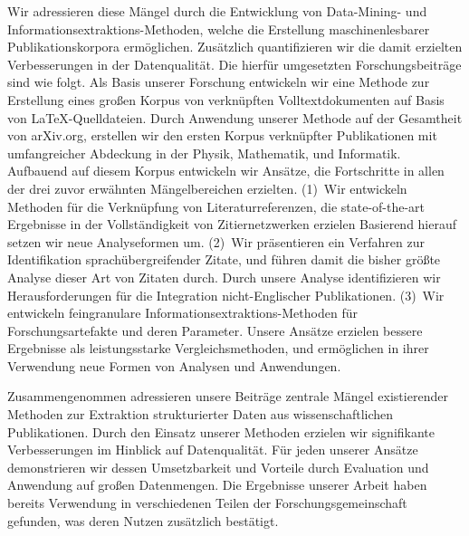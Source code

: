 Wir adressieren diese Mängel durch die Entwicklung von Data-Mining- und In\-for\-ma\-tions\-ex\-trak\-tions-Methoden, welche die Erstellung maschinenlesbarer Publikationskorpora ermöglichen. Zusätzlich quantifizieren wir die damit erzielten Verbesserungen in der Datenqualität.
Die hierfür umgesetzten Forschungsbeiträge sind wie folgt.
Als Basis unserer Forschung entwickeln wir eine Methode zur Erstellung eines großen Korpus von verknüpften Volltextdokumenten auf Basis von \LaTeX{}-Quelldateien.
Durch Anwendung unserer Methode auf der Gesamtheit von arXiv.org, erstellen wir den ersten Korpus verknüpfter Publikationen mit umfangreicher Abdeckung in der Physik, Mathematik, und Informatik.
Aufbauend auf diesem Korpus entwickeln wir Ansätze, die Fortschritte in allen der drei zuvor erwähnten Mängelbereichen erzielten.
(1)~Wir entwickeln Methoden für die Verknüpfung von Literaturreferenzen, die state-of-the-art Ergebnisse in der Vollständigkeit von Zitiernetzwerken erzielen
Basierend hierauf setzen wir neue Analyseformen um.
(2)~Wir präsentieren ein Verfahren zur Identifikation sprachübergreifender Zitate, und führen damit die bisher größte Analyse dieser Art von Zitaten durch.
Durch unsere Analyse identifizieren wir Herausforderungen für die Integration nicht-Englischer Publikationen.
(3)~Wir entwickeln feingranulare In\-for\-ma\-tions\-ex\-trak\-tions-Methoden für Forschungsartefakte und deren Parameter. Unsere Ansätze erzielen bessere Ergebnisse als leistungsstarke Vergleichsmethoden, und ermöglichen in ihrer Verwendung neue Formen von Analysen und Anwendungen.

Zusammengenommen adressieren unsere Beiträge zentrale Mängel existierender Methoden zur Extraktion strukturierter Daten aus wissenschaftlichen Publikationen.
Durch den Einsatz unserer Methoden erzielen wir signifikante Verbesserungen im Hinblick auf Datenqualität.
Für jeden unserer Ansätze demonstrieren wir dessen Umsetzbarkeit und Vorteile durch Evaluation und Anwendung auf großen Datenmengen.
Die Ergebnisse unserer Arbeit haben bereits Verwendung in verschiedenen Teilen der Forschungsgemeinschaft gefunden, was deren Nutzen zusätzlich bestätigt.

